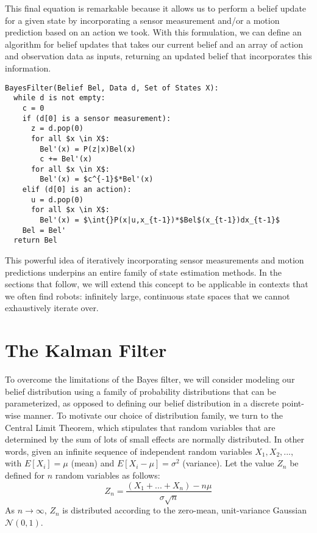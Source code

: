 This final equation is remarkable because it allows us to perform a belief update for a given state by incorporating a sensor measurement and/or a motion prediction based on an action we took. With this formulation, we can define an algorithm for belief updates that takes our current belief and an array of action and observation data as inputs, returning an updated belief that incorporates this information.

\begin{Verbatim}[commandchars=\\\{\}, codes={\catcode`$=3\catcode`^=7\catcode`_=8}]
BayesFilter(Belief Bel, Data d, Set of States X):
  while d is not empty:
    c = 0
    if (d[0] is a sensor measurement):
      z = d.pop(0)
      for all $x \in X$:
        Bel'(x) = P(z|x)Bel(x)
        c += Bel'(x)
      for all $x \in X$:
        Bel'(x) = $c^{-1}$*Bel'(x)
    elif (d[0] is an action):
      u = d.pop(0)
      for all $x \in X$:
        Bel'(x) = $\int{}P(x|u,x_{t-1})*$Bel$(x_{t-1})dx_{t-1}$
    Bel = Bel'
  return Bel
\end{Verbatim}

This powerful idea of iteratively incorporating sensor measurements and motion predictions underpins an entire family of state estimation methods. In the sections that follow, we will extend this concept to be applicable in contexts that we often find robots: infinitely large, continuous state spaces that we cannot exhaustively iterate over.

\section{The Kalman Filter}
To overcome the limitations of the Bayes filter, we will consider modeling our belief distribution using a family of probability distributions that can be parameterized, as opposed to defining our belief distribution in a discrete point-wise manner. To motivate our choice of distribution family, we turn to the Central Limit Theorem, which stipulates that random variables that are determined by the sum of lots of small effects are normally distributed. In other words, given an infinite sequence of independent random variables $X_1, X_2, ...$, with $E[X_i]=\mu$ (mean) and $E[X_i-\mu]=\sigma^2$ (variance). Let the value $Z_n$ be defined for $n$ random variables as follows:
$$
Z_n = \frac{(X_1+...+X_n)-n\mu}{\sigma\sqrt{n}}
$$
As $n\rightarrow \infty$, $Z_n$ is distributed according to the zero-mean, unit-variance Gaussian 
$\mathcal{N}(0,1)$.\\

